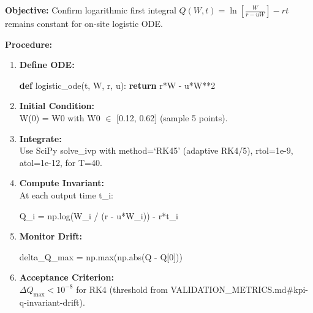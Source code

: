 \documentclass[
]{article}
\newenvironment{Shaded}{}{}
\newcommand{\BuiltInTok}[1]{\textcolor[rgb]{0.00,0.50,0.00}{#1}}
\newcommand{\ControlFlowTok}[1]{\textcolor[rgb]{0.00,0.44,0.13}{\textbf{#1}}}
\newcommand{\DecValTok}[1]{\textcolor[rgb]{0.25,0.63,0.44}{#1}}
\newcommand{\KeywordTok}[1]{\textcolor[rgb]{0.00,0.44,0.13}{\textbf{#1}}}
\newcommand{\NormalTok}[1]{#1}
\newcommand{\OperatorTok}[1]{\textcolor[rgb]{0.40,0.40,0.40}{#1}}
\begin{document}
\textbf{Objective:} Confirm logarithmic first integral
\(Q(W,t) = \ln\!\left[\tfrac{W}{r-uW}\right] - r t\) remains constant
for on-site logistic ODE.

\textbf{Procedure:}

\begin{enumerate}
\def\labelenumi{\arabic{enumi}.}
\item
  \textbf{Define ODE:}

\begin{Shaded}
\begin{Highlighting}[]
\KeywordTok{def}\NormalTok{ logistic\_ode(t, W, r, u):}
    \ControlFlowTok{return}\NormalTok{ r}\OperatorTok{*}\NormalTok{W }\OperatorTok{{-}}\NormalTok{ u}\OperatorTok{*}\NormalTok{W}\OperatorTok{**}\DecValTok{2}
\end{Highlighting}
\end{Shaded}
\item
  \textbf{Initial Condition:}\\
  W(0) = W0 with W0 $\in$ {[}0.12, 0.62{]} (sample 5 points).
\item
  \textbf{Integrate:}\\
  Use SciPy solve\_ivp with method=`RK45' (adaptive RK4/5), rtol=1e-9,
  atol=1e-12, for T=40.
\item
  \textbf{Compute Invariant:}\\
  At each output time t\_i:

\begin{Shaded}
\begin{Highlighting}[]
\NormalTok{Q\_i }\OperatorTok{=}\NormalTok{ np.log(W\_i }\OperatorTok{/}\NormalTok{ (r }\OperatorTok{{-}}\NormalTok{ u}\OperatorTok{*}\NormalTok{W\_i)) }\OperatorTok{{-}}\NormalTok{ r}\OperatorTok{*}\NormalTok{t\_i}
\end{Highlighting}
\end{Shaded}
\item
  \textbf{Monitor Drift:}

\begin{Shaded}
\begin{Highlighting}[]
\NormalTok{delta\_Q\_max }\OperatorTok{=}\NormalTok{ np.}\BuiltInTok{max}\NormalTok{(np.}\BuiltInTok{abs}\NormalTok{(Q }\OperatorTok{{-}}\NormalTok{ Q[}\DecValTok{0}\NormalTok{]))}
\end{Highlighting}
\end{Shaded}
\item
  \textbf{Acceptance Criterion:}\\
  \(\Delta Q_{\max} < 10^{-8}\) for RK4 (threshold from
  VALIDATION\_METRICS.md\#kpi-q-invariant-drift).
\end{enumerate}
\end{document}
